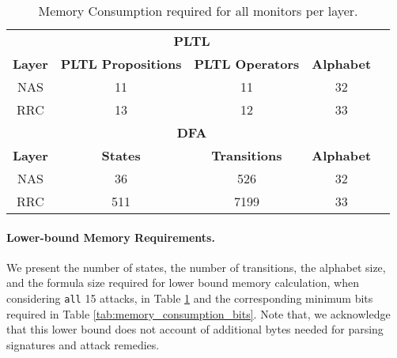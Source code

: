 \begin{table}[h!]
\begin{tabular}{ccccc}
 \multicolumn{4}{|c|}{\textbf{PLTL}}                                                                                                                                          &                                      \\ \cline{1-4}
 \multicolumn{1}{|c|}{\textbf{Layer}} & \multicolumn{1}{c|}{\textbf{PLTL Propositions}} & \multicolumn{1}{c|}{\textbf{PLTL Operators}} & \multicolumn{1}{c|}{\textbf{Alphabet}} &                                      \\ \cline{1-4}
 \multicolumn{1}{|c|}{NAS}            & \multicolumn{1}{c|}{11}                         & \multicolumn{1}{c|}{11}                  & \multicolumn{1}{c|}{32}               &                                      \\ \cline{1-4}
 \multicolumn{1}{|c|}{RRC}            & \multicolumn{1}{c|}{13}                        & \multicolumn{1}{c|}{12}                 & \multicolumn{1}{c|}{33}               &                                      \\ \cline{1-4}

\multicolumn{4}{|c|}{\textbf{DFA}}                                                                                                                                          &                                      \\ \cline{1-4}
\multicolumn{1}{|c|}{\textbf{Layer}} & \multicolumn{1}{c|}{\textbf{States}}            & \multicolumn{1}{c|}{\textbf{Transitions}} & \multicolumn{1}{c|}{\textbf{Alphabet}} &                                      \\ \cline{1-4}
\multicolumn{1}{|c|}{NAS}            & \multicolumn{1}{c|}{36}                         & \multicolumn{1}{c|}{526}                  & \multicolumn{1}{c|}{32}               &                                      \\ \cline{1-4}
\multicolumn{1}{|c|}{RRC}            & \multicolumn{1}{c|}{511}                        & \multicolumn{1}{c|}{7199}                 & \multicolumn{1}{c|}{33}               &                                      \\ \cline{1-4}
\end{tabular}
\caption{Memory Consumption required for all monitors per layer.}
\label{tab:memory_consumption_small}
\end{table}
\clearpage
\paragraph{Lower-bound Memory Requirements.}
We present the number of states, the number of transitions, the alphabet size,
and the formula size required for lower bound memory calculation, when considering
\texttt{all} 15 attacks,
in Table \ref{tab:memory_consumption_small} and the corresponding minimum bits
required in Table \ref{tab:memory_consumption_bits}.
Note that, we acknowledge that this lower bound does not account of
additional bytes needed for parsing signatures and attack remedies.

